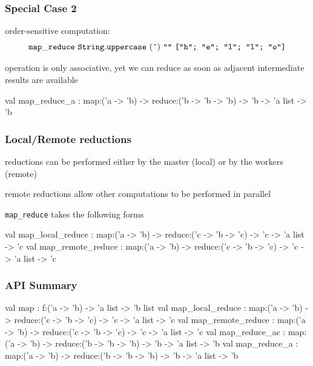 \documentclass{beamer}
\let\emph\alert
\begin{document}
\begin{frame}\frametitle{Special Case 2}

  \emph{order-sensitive} computation:
  \begin{displaymath}
    \mathtt{map\_reduce}~\mathtt{String.uppercase}~(\texttt{\^{}})~\texttt{""}~
    \texttt{["h"; "e"; "l"; "l"; "o"]}
  \end{displaymath}

  operation is only \emph{associative}, yet we can reduce as soon as
  adjacent intermediate results are available



\begin{ocaml}
val map_reduce_a :
  map:('a -> 'b) -> reduce:('b -> 'b -> 'b) -> 
  'b -> 'a list -> 'b
\end{ocaml}
\end{frame}

\begin{frame}\frametitle{Local/Remote reductions}
  reductions can be performed either by the master (local) or by the
  workers (remote)

  \bigskip
  remote reductions allow other computations to be performed in parallel


  \texttt{map\_reduce} takes the following forms
  \begin{ocaml}
val map_local_reduce :
  map:('a -> 'b) -> reduce:('c -> 'b -> 'c) -> 
  'c -> 'a list -> 'c
val map_remote_reduce :
  map:('a -> 'b) -> reduce:('c -> 'b -> 'c) -> 
  'c -> 'a list -> 'c
  \end{ocaml}
\end{frame}

\begin{frame}\frametitle{API Summary}
  \begin{ocaml}
val map : 
  f:('a -> 'b) -> 'a list -> 'b list
val map_local_reduce :
  map:('a -> 'b) -> reduce:('c -> 'b -> 'c) -> 
  'c -> 'a list -> 'c
val map_remote_reduce :
  map:('a -> 'b) -> reduce:('c -> 'b -> 'c) -> 
  'c -> 'a list -> 'c
val map_reduce_ac :
  map:('a -> 'b) -> reduce:('b -> 'b -> 'b) -> 
  'b -> 'a list -> 'b
val map_reduce_a :
  map:('a -> 'b) -> reduce:('b -> 'b -> 'b) -> 
  'b -> 'a list -> 'b
  \end{ocaml}
\end{frame}
\end{document}
